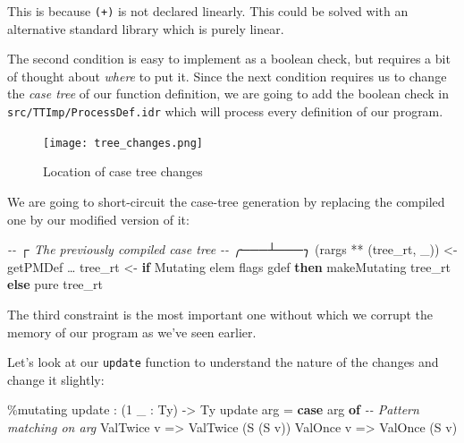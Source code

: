 \documentclass[
]{article}
\newenvironment{Shaded}{}{}
\newcommand{\CommentTok}[1]{\textcolor[rgb]{0.38,0.63,0.69}{\textit{#1}}}
\newcommand{\DataTypeTok}[1]{\textcolor[rgb]{0.56,0.13,0.00}{#1}}
\newcommand{\DecValTok}[1]{\textcolor[rgb]{0.25,0.63,0.44}{#1}}
\newcommand{\FunctionTok}[1]{\textcolor[rgb]{0.02,0.16,0.49}{#1}}
\newcommand{\KeywordTok}[1]{\textcolor[rgb]{0.00,0.44,0.13}{\textbf{#1}}}
\newcommand{\NormalTok}[1]{#1}
\newcommand{\OperatorTok}[1]{\textcolor[rgb]{0.40,0.40,0.40}{#1}}
\newcommand{\OtherTok}[1]{\textcolor[rgb]{0.00,0.44,0.13}{#1}}
\begin{document}
This is because \texttt{(+)} is not declared linearly. This could be
solved with an alternative standard library which is purely linear.

The second condition is easy to implement as a boolean check, but
requires a bit of thought about \emph{where} to put it. Since the next
condition requires us to change the \emph{case tree} of our function
definition, we are going to add the boolean check in
\texttt{src/TTImp/ProcessDef.idr} which will process every definition of
our program.

\begin{figure}
\centering
\texttt{[image: tree\_changes.png]}
\caption{Location of case tree changes}
\end{figure}

We are going to short-circuit the case-tree generation by replacing the
compiled one by our modified version of it:

\begin{Shaded}
\begin{Highlighting}[]
\CommentTok{{-}{-}            ┌ The previously compiled case tree}
\CommentTok{{-}{-}        ╭───┴───╮}
\NormalTok{(rargs }\OperatorTok{**}\NormalTok{ (tree\_rt\textquotesingle{}, \_)) }\OtherTok{\textless{}{-}}\NormalTok{ getPMDef …}
\NormalTok{tree\_rt }\OtherTok{\textless{}{-}} \KeywordTok{if} \DataTypeTok{Mutating} \OtherTok{\textasciigrave{}elem\textasciigrave{}}\NormalTok{ flags gdef}
              \KeywordTok{then}\NormalTok{ makeMutating tree\_rt\textquotesingle{}}
              \KeywordTok{else} \FunctionTok{pure}\NormalTok{ tree\_rt\textquotesingle{}}
\end{Highlighting}
\end{Shaded}

The third constraint is the most important one without which we corrupt
the memory of our program as we've seen earlier.

Let's look at our \texttt{update} function to understand the nature of
the changes and change it slightly:

\begin{Shaded}
\begin{Highlighting}[]
\OperatorTok{\%}\NormalTok{mutating}
\NormalTok{update }\OperatorTok{:}\NormalTok{ (}\DecValTok{1}\NormalTok{ \_ }\OperatorTok{:} \DataTypeTok{Ty}\NormalTok{) }\OtherTok{{-}\textgreater{}} \DataTypeTok{Ty}
\NormalTok{update arg }\OtherTok{=} \KeywordTok{case}\NormalTok{ arg }\KeywordTok{of} \CommentTok{{-}{-} Pattern matching on arg}
                  \DataTypeTok{ValTwice}\NormalTok{ v }\OtherTok{=\textgreater{}} \DataTypeTok{ValTwice}\NormalTok{ (}\DataTypeTok{S}\NormalTok{ (}\DataTypeTok{S}\NormalTok{ v))}
                  \DataTypeTok{ValOnce}\NormalTok{ v }\OtherTok{=\textgreater{}} \DataTypeTok{ValOnce}\NormalTok{ (}\DataTypeTok{S}\NormalTok{ v)}
\end{Highlighting}
\end{Shaded}
\end{document}
